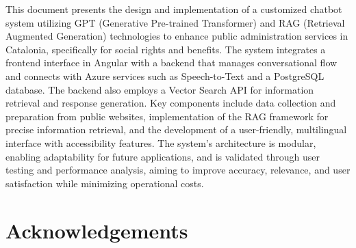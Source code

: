 \documentclass[a4paper,12pt,twoside]{ThesisStyle}
\begin{document}

This document presents the design and implementation of a customized chatbot system utilizing GPT (Generative Pre-trained Transformer) and RAG (Retrieval Augmented Generation) technologies to enhance public administration services in Catalonia, specifically for social rights and benefits. The system integrates a frontend interface in Angular with a backend that manages conversational flow and connects with Azure services such as Speech-to-Text and a PostgreSQL database. The backend also employs a Vector Search API for information retrieval and response generation. Key components include data collection and preparation from public websites, implementation of the RAG framework for precise information retrieval, and the development of a user-friendly, multilingual interface with accessibility features. The system's architecture is modular, enabling adaptability for future applications, and is validated through user testing and performance analysis, aiming to improve accuracy, relevance, and user satisfaction while minimizing operational costs.

\chapter*{Acknowledgements}
\end{document}
